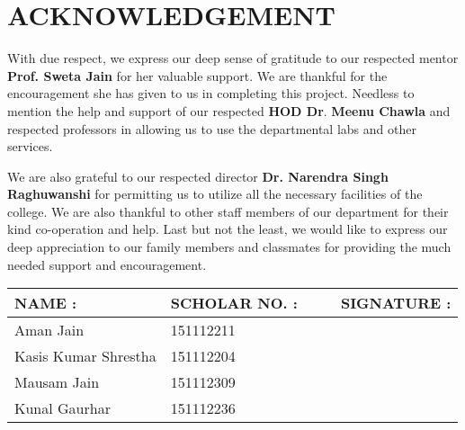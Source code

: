 \documentclass{article} %
\begin{document}
\noindent 


\section{        ACKNOWLEDGEMENT }

\noindent \textbf{ }

\noindent With due respect, we express our deep sense of gratitude to our respected mentor \textbf{Prof. Sweta Jain} for her valuable support. We are thankful for the encouragement she has given to us in completing this project. Needless to mention the help and support of our respected \textbf{HOD Dr}. \textbf{Meenu Chawla} and respected professors in allowing us to use the departmental labs and other services. 

\noindent We are also grateful to our respected director \textbf{Dr. Narendra Singh Raghuwanshi} for permitting us to utilize all the necessary facilities of the college. We are also thankful to other staff members of our department for their kind co-operation and help. Last but not the least, we would like to express our deep appreciation to our family members and classmates for providing the much needed support and encouragement. 

\noindent  

\noindent  

\noindent  

\begin{tabular}{|p{1.7in}|p{1.0in}|p{0.3in}|p{0.3in}|p{0.8in}|} \hline 
\textbf{NAME :  }      & \textbf{SCHOLAR NO.} :  &   &   & \textbf{SIGNATURE :}  \\ \hline 
Aman Jain    &    151112211         &  &  &  \\ \hline 
Kasis Kumar Shrestha                                &    151112204  &  &  &  \\ \hline 
Mausam Jain                  &    151112309 &  &  &  \\ \hline 
Kunal Gaurhar  &    151112236  &  &  &  \\ \hline 
\end{tabular}

 

\noindent  

\noindent  

\noindent  

\noindent  

\noindent 

\noindent 

\noindent  
\end{document}

